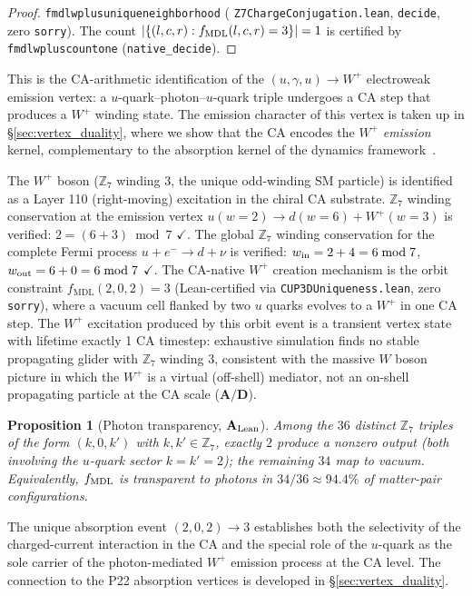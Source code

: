 \documentclass[11pt]{article}
\newtheorem{proposition}[theorem]{Proposition}
\theoremstyle{remark}
\newcommand{\lean}[1]{%
  \penalty-100
  \begingroup\def\_{\textunderscore\allowbreak}\texttt{#1}\endgroup}
\newcommand{\CatAL}{\ensuremath{\textbf{A}_{\rm Lean}}}
\newcommand{\CatAD}{\textbf{A/D}}
\begin{document}
\begin{proof}
\lean{fmdl\_w\_plus\_unique\_neighborhood} (\lean{Z7ChargeConjugation.lean},
\texttt{decide}, zero \texttt{sorry}).
The count $|\{(l,c,r) : f_{\rm MDL}(l,c,r) = 3\}| = 1$ is certified by
\lean{fmdl\_w\_plus\_count\_one} (\texttt{native\_decide}).
\end{proof}

This is the CA-arithmetic identification of the $(u, \gamma, u) \to W^+$ electroweak
emission vertex: a $u$-quark--photon--$u$-quark triple undergoes a CA step that
produces a $W^+$ winding state.
The emission character of this vertex is taken up in \S\ref{sec:vertex_duality},
where we show that the CA encodes the $W^+$ \emph{emission} kernel, complementary to
the absorption kernel of the dynamics framework~\cite{Spivack2026_UGPDynamics}.

The $W^+$ boson ($\mathbb{Z}_7$ winding 3, the unique odd-winding SM particle) is identified as a Layer 110 (right-moving) excitation in the chiral CA substrate. $\mathbb{Z}_7$ winding conservation at the emission vertex $u(w=2) \to d(w=6) + W^+(w=3)$ is verified: $2 = (6+3) \bmod 7$ $\checkmark$. The global $\mathbb{Z}_7$ winding conservation for the complete Fermi process $u + e^- \to d + \nu$ is verified: $w_{\rm in} = 2+4 = 6 \bmod 7$, $w_{\rm out} = 6+0 = 6 \bmod 7$ $\checkmark$. The CA-native $W^+$ creation mechanism is the orbit constraint $f_{\mathrm{MDL}}(2,0,2) = 3$ (Lean-certified via \texttt{CUP3DUniqueness.lean}, zero \texttt{sorry}), where a vacuum cell flanked by two $u$ quarks evolves to a $W^+$ in one CA step. The $W^+$ excitation produced by this orbit event is a transient vertex state with lifetime exactly 1 CA timestep: exhaustive simulation finds no stable propagating glider with $\mathbb{Z}_7$ winding 3, consistent with the massive $W$ boson picture in which the $W^+$ is a virtual (off-shell) mediator, not an on-shell propagating particle at the CA scale ($\CatAD$).

\begin{proposition}[Photon transparency, $\CatAL$]\label{prop:photon_transparent}
Among the $36$ distinct $\mathbb{Z}_7$ triples of the form $(k, 0, k')$ with
$k, k' \in \mathbb{Z}_7$, exactly $2$ produce a nonzero output (both involving the
$u$-quark sector $k = k' = 2$); the remaining $34$ map to vacuum.
Equivalently, $f_{\rm MDL}$ is transparent to photons in $34/36 \approx 94.4\%$ of
matter-pair configurations.
\end{proposition}

The unique absorption event $(2, 0, 2) \to 3$ establishes both the selectivity of
the charged-current interaction in the CA and the special role of the $u$-quark as
the sole carrier of the photon-mediated $W^+$ emission process at the CA level.
The connection to the P22 absorption vertices is developed in \S\ref{sec:vertex_duality}.
\end{document}
